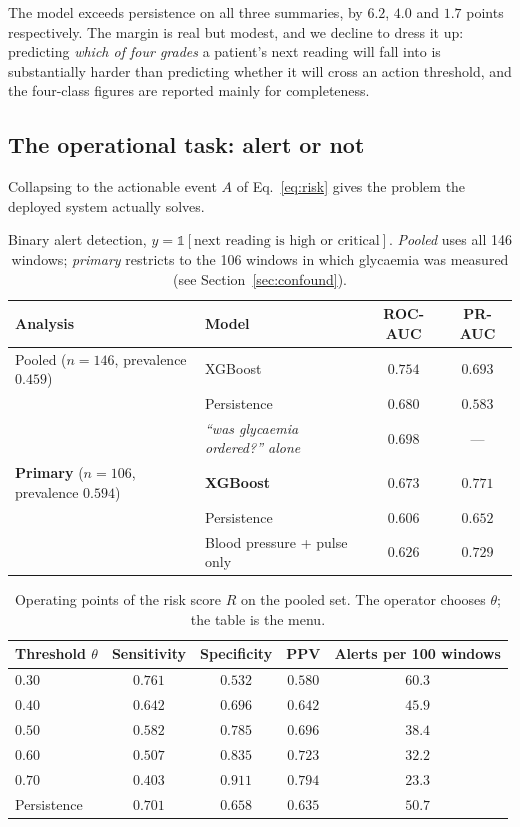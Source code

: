 \documentclass[11pt,a4paper]{article}
\begin{document}
The model exceeds persistence on all three summaries, by $6.2$, $4.0$ and $1.7$
points respectively. The margin is real but modest, and we decline to dress it up:
predicting \emph{which of four grades} a patient's next reading will fall into is
substantially harder than predicting whether it will cross an action threshold, and
the four-class figures are reported mainly for completeness.

\subsection{The operational task: alert or not}

Collapsing to the actionable event $A$ of Eq.~\eqref{eq:risk} gives the problem the
deployed system actually solves.

\begin{table}[htbp]
\centering
\caption{Binary alert detection, $y = \mathbb{1}[\text{next reading is high or
critical}]$. \emph{Pooled} uses all 146 windows; \emph{primary} restricts to the
106 windows in which glycaemia was measured (see Section~\ref{sec:confound}).}
\label{tab:binary}
\small
\begin{tabular}{llcc}
\toprule
Analysis & Model & ROC-AUC & PR-AUC \\
\midrule
Pooled ($n=146$, prevalence $0.459$)
  & XGBoost                      & $0.754$ & $0.693$ \\
  & Persistence                  & $0.680$ & $0.583$ \\
  & \emph{``was glycaemia ordered?'' alone} & \emph{$0.698$} & --- \\
\midrule
\textbf{Primary} ($n=106$, prevalence $0.594$)
  & \textbf{XGBoost}             & $\mathbf{0.673}$ & $\mathbf{0.771}$ \\
  & Persistence                  & $0.606$ & $0.652$ \\
  & Blood pressure + pulse only  & $0.626$ & $0.729$ \\
\bottomrule
\end{tabular}
\end{table}

\begin{table}[htbp]
\centering
\caption{Operating points of the risk score $R$ on the pooled set. The operator
chooses $\theta$; the table is the menu.}
\label{tab:operating}
\small
\begin{tabular}{lcccc}
\toprule
Threshold $\theta$ & Sensitivity & Specificity & PPV & Alerts per 100 windows \\
\midrule
$0.30$ & $0.761$ & $0.532$ & $0.580$ & $60.3$ \\
$0.40$ & $0.642$ & $0.696$ & $0.642$ & $45.9$ \\
$0.50$ & $0.582$ & $0.785$ & $0.696$ & $38.4$ \\
$0.60$ & $0.507$ & $0.835$ & $0.723$ & $32.2$ \\
$0.70$ & $0.403$ & $0.911$ & $0.794$ & $23.3$ \\
\midrule
Persistence & $0.701$ & $0.658$ & $0.635$ & $50.7$ \\
\bottomrule
\end{tabular}
\end{table}
\end{document}
